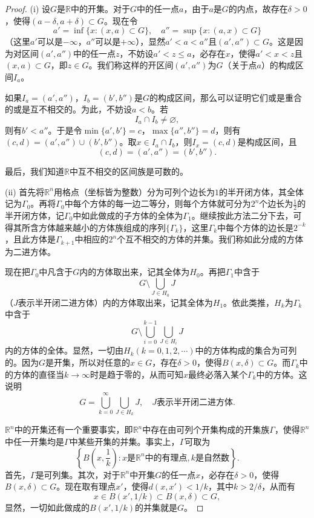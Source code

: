 \documentclass[../../main.tex]{subfiles}
\begin{document}
\begin{proof}
  (i) 设\(G\)是\(\mathbb{R}\)中的开集。对于\(G\)中的任一点\(a\)，由于\(a\)是\(G\)的内点，故存在\(\delta>0\)，使得\((a - \delta,a + \delta)\subset G\)。现在令
\[a'=\inf\{x:(x,a)\subset G\},\quad a''=\sup\{x:(a,x)\subset G\}\]
（这里\(a'\)可以是\(-\infty\)，\(a''\)可以是\(+\infty\)），显然\(a'<a<a''\)且\((a',a'')\subset G\)。这是因为对区间\((a',a'')\)中的任一点\(z\)，不妨设\(a'<z\leqslant a\)，必存在\(x\)，使得\(a'<x<z\)且\((x,a)\subset G\)，即\(z\in G\)。我们称这样的开区间\((a',a'')\)为\(G\)（关于点\(a\)）的{\heiti 构成区间}\(I_a\)。

如果\(I_a=(a',a'')\)，\(I_b=(b',b'')\)是\(G\)的构成区间，那么可以证明它们或是重合的或是互不相交的。为此，不妨设\(a < b\)。若
\[I_a\cap I_b\neq\varnothing,\]
则有\(b'<a''\)。于是令\(\min\{a',b'\}=c\)，\(\max\{a'',b''\}=d\)，则有\((c,d)=(a',a'')\cup(b',b'')\)。取\(x\in I_a\cap I_b\)，则\(I_x=(c,d)\)是构成区间，且
\[(c,d)=(a',a'')=(b',b'').\]

最后，我们知道\(\mathbb{R}\)中互不相交的区间族是可数的。

(ii) 首先将\(\mathbb{R}^n\)用格点（坐标皆为整数）分为可列个边长为\(1\)的半开闭方体，其全体记为\(\Gamma_0\)。再将\(\Gamma_0\)中每个方体的每一边二等分，则每个方体就可分为\(2^n\)个边长为\(\frac{1}{2}\)的半开闭方体，记\(\Gamma_0\)中如此做成的子方体的全体为\(\Gamma_1\)。继续按此方法二分下去，可得其所含方体越来越小的方体族组成的序列\(\{\Gamma_k\}\)，这里\(\Gamma_k\)中每个方体的边长是\(2^{-k}\)，且此方体是\(\Gamma_{k + 1}\)中相应的\(2^n\)个互不相交的方体的并集。我们称如此分成的方体为二进方体。

现在把\(\Gamma_0\)中凡含于\(G\)内的方体取出来，记其全体为\(H_0\)。再把\(\Gamma_1\)中含于
\[G\setminus\bigcup_{J\in H_0}J\]
（\(J\)表示半开闭二进方体）内的方体取出来，记其全体为\(H_1\)。依此类推，\(H_k\)为\(\Gamma_k\)中含于
\[G\setminus\bigcup_{i = 0}^{k - 1}\bigcup_{J\in H_i}J\]
内的方体的全体。显然，一切由\(H_k(k = 0,1,2,\cdots)\)中的方体构成的集合为可列的。因为\(G\)是开集，所以对任意的\(x\in G\)，存在\(\delta>0\)，使得\(B(x,\delta)\subset G\)。而\(\Gamma_k\)中的方体的直径当\(k\rightarrow\infty\)时是趋于零的，从而可知\(x\)最终必落入某个\(\Gamma_k\)中的方体。这说明
\[G=\bigcup_{k = 0}^{\infty}\bigcup_{J\in H_k}J,\quad J表示半开闭二进方体.\]

\(\mathbb{R}^n\)中的开集还有一个重要事实，即\(\mathbb{R}^n\)中存在由可列个开集构成的开集族\(\Gamma\)，使得\(\mathbb{R}^n\)中任一开集均是\(\Gamma\)中某些开集的并集。事实上，\(\Gamma\)可取为
\[\left\{B\left(x,\frac{1}{k}\right):x是\mathbb{R}^n中的有理点,k是自然数\right\}.\]
首先，\(\Gamma\)是可列集。其次，对于\(\mathbb{R}^n\)中开集\(G\)的任一点\(x\)，必存在\(\delta>0\)，使得\(B(x,\delta)\subset G\)。现在取有理点\(x'\)，使得\(d(x,x')<1/k\)，其中\(k > 2/\delta\)，从而有
\[x\in B(x',1/k)\subset B(x,\delta)\subset G,\]
显然，一切如此做成的\(B(x',1/k)\)的并集就是\(G\)。
\end{proof}
\end{document}
